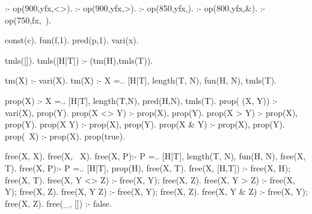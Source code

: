 :- op(900,yfx,<>). %
:- op(900,yfx,>). %
:- op(850,yfx,\/). %
:- op(800,yfx,\&). %
:- op(750,fx,~). %

const(c). %
fun(f,1). %
pred(p,1). %
vari(x). %

tmls([]). %
tmls([H|T]) :- (tm(H),tmls(T)). %

tm(X) :- vari(X).
tm(X) :- X =.. [H|T], length(T, N), fun(H, N), tmls(T).

prop(X) :- X =.. [H|T], length(T,N), pred(H,N), tmls(T).
prop(\+ (X, \+ Y)) :- vari(X), prop(Y).
prop(X <> Y) :- prop(X), prop(Y).
prop(X > Y) :- prop(X), prop(Y).
prop(X \/ Y) :- prop(X), prop(Y).
prop(X \& Y) :- prop(X), prop(Y).
prop(~X) :- prop(X).
prop(true).

free(X, X).
free(X, ~X).
free(X, P):- P =.. [H|T], length(T, N), fun(H, N), free(X, T).
free(X, P):- P =.. [H|T], prop(H), free(X, T).
free(X, [H,T]) :- free(X, H); free(X, T).
free(X, Y <> Z) :- free(X, Y); free(X, Z).
free(X, Y > Z) :- free(X, Y); free(X, Z).
free(X, Y \/ Z) :- free(X, Y); free(X, Z).
free(X, Y \& Z) :- free(X, Y); free(X, Z).
free(_, []) :- false.
